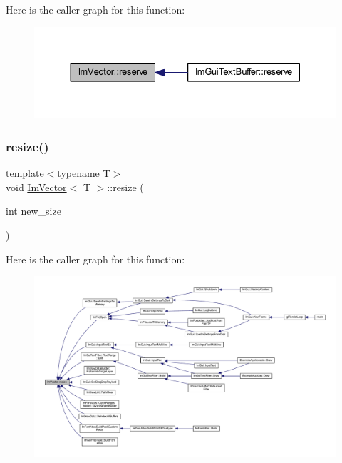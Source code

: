 Here is the caller graph for this function\+:
\nopagebreak
\begin{figure}[H]
\begin{center}
\leavevmode
\includegraphics[width=330pt]{class_im_vector_a0f14f5736c3372157856eebb67123b75_icgraph}
\end{center}
\end{figure}
\mbox{\label{class_im_vector_ac371dd62e56ae486b1a5038cf07eee56}} 
\subsubsection{\texorpdfstring{resize()}{resize()}\hspace{0.1cm}{\footnotesize\ttfamily [1/2]}}
{\footnotesize\ttfamily template$<$typename T$>$ \\
void \mbox{\hyperlink{class_im_vector}{Im\+Vector}}$<$ T $>$\+::resize (\begin{DoxyParamCaption}\item[{int}]{new\+\_\+size }\end{DoxyParamCaption})\hspace{0.3cm}{\ttfamily [inline]}}

Here is the caller graph for this function\+:
\nopagebreak
\begin{figure}[H]
\begin{center}
\leavevmode
\includegraphics[width=350pt]{class_im_vector_ac371dd62e56ae486b1a5038cf07eee56_icgraph}
\end{center}
\end{figure}
\mbox{\label{class_im_vector_a1ea8f92d2e1c48772b3765b76a46c543}} 
